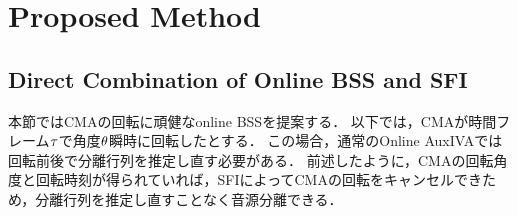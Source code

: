 \documentclass[sip,biber]{now-journal}
\begin{document}
\section{Proposed Method}\label{sec:proposed}

\subsection{Direct Combination of Online BSS and SFI}

本節ではCMAの回転に頑健なonline BSSを提案する．
以下では，CMAが時間フレーム$\tau$で角度$\theta$瞬時に回転したとする．
この場合，通常のOnline AuxIVAでは回転前後で分離行列を推定し直す必要がある．
前述したように，CMAの回転角度と回転時刻が得られていれば，SFIによってCMAの回転をキャンセルできため，分離行列を推定し直すことなく音源分離できる．
\end{document}
